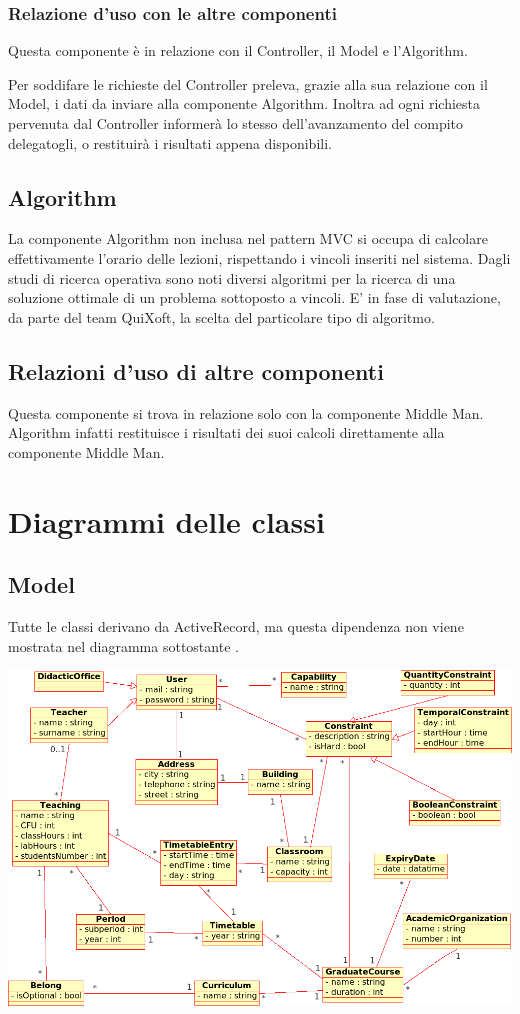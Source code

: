 \documentclass[11pt,a4paper]{article}
\begin{document}
\subsubsection{Relazione d'uso con le altre componenti}
Questa componente è in relazione con il Controller, il Model e l'Algorithm. 

Per soddifare le richieste del Controller preleva, grazie alla sua relazione con il Model, i dati da inviare alla componente Algorithm. Inoltra ad ogni richiesta pervenuta dal Controller informerà lo stesso dell'avanzamento del compito delegatogli, o restituirà i risultati appena disponibili.
\subsection{Algorithm}
La componente Algorithm non inclusa nel pattern MVC si occupa di calcolare effettivamente l'orario delle lezioni, rispettando i vincoli inseriti nel sistema. Dagli studi di ricerca operativa sono noti diversi algoritmi per la ricerca di una soluzione ottimale di un problema sottoposto a vincoli. E' in fase di valutazione, da parte del team QuiXoft, la scelta del particolare tipo di algoritmo.
\subsection{Relazioni d'uso di altre componenti}
Questa componente si trova in relazione solo con la componente Middle Man. Algorithm infatti restituisce i risultati dei suoi calcoli direttamente alla componente Middle Man.

\section{Diagrammi delle classi}
\subsection{Model}


Tutte le classi derivano da ActiveRecord, ma questa dipendenza non viene mostrata nel diagramma sottostante .
\begin{center}
\includegraphics[scale=0.3]{images/class_diagram.png}
\end{center}
\end{document}

